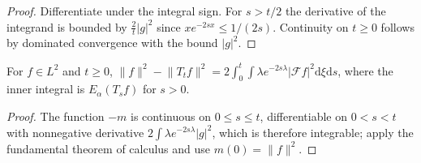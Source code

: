 \begin{proof}
\leanok
Differentiate under the integral sign. For $s > t/2$ the derivative of the integrand is bounded by $\frac{2}{t}\lvert g\rvert^2$ since $x e^{-2sx} \le 1/(2s)$. Continuity on $t \ge 0$ follows by dominated convergence with the bound $\lvert g\rvert^2$.
\end{proof}

\begin{theorem}[Hardy--Stein identity for $p = 2$]\label{thm:hardy_stein_l2}
\leanok
For $f \in L^2$ and $t \ge 0$, $\lVert f\rVert^2 - \lVert T_t f\rVert^2 = 2\int_0^t \int \lambda e^{-2s\lambda}\lvert\mathcal{F} f\rvert^2 \mathrm{d}\xi \mathrm{d}s$, where the inner integral is $E_\alpha(T_s f)$ for $s > 0$.
\end{theorem}

\begin{proof}
\leanok
The function $-m$ is continuous on $0 \le s \le t$, differentiable on $0 < s < t$ with nonnegative derivative $2\int \lambda e^{-2s\lambda}\lvert g\rvert^2$, which is therefore integrable; apply the fundamental theorem of calculus and use $m(0) = \lVert f\rVert^2$.
\end{proof}
